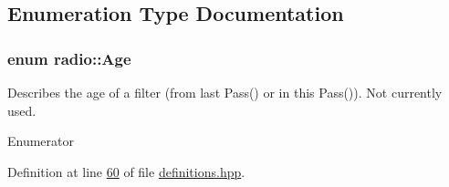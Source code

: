 \subsection{Enumeration Type Documentation}
\hypertarget{namespaceradio_a90839d95c13fa21f45e9cd380e38f1f3}{
\subsubsection[{Age}]{\setlength{\rightskip}{0pt plus 5cm}enum {\bf radio\+::\+Age}}}\label{namespaceradio_a90839d95c13fa21f45e9cd380e38f1f3}
Describes the age of a filter (from last Pass() or in this Pass()). Not currently used. \begin{Desc}
\item[Enumerator]\par
\begin{description}
\item[{\em 
\hypertarget{namespaceradio_a90839d95c13fa21f45e9cd380e38f1f3afbe8ecd067dc1095175b7cdc7cecbb82}{O\+L\+D}\label{namespaceradio_a90839d95c13fa21f45e9cd380e38f1f3afbe8ecd067dc1095175b7cdc7cecbb82}
}]\item[{\em 
\hypertarget{namespaceradio_a90839d95c13fa21f45e9cd380e38f1f3ac1a7d3b0b6d1c9639e94bdd8c8692686}{N\+E\+W}\label{namespaceradio_a90839d95c13fa21f45e9cd380e38f1f3ac1a7d3b0b6d1c9639e94bdd8c8692686}
}]\end{description}
\end{Desc}


Definition at line \hyperlink{definitions_8hpp_source_l00060}{60} of file \hyperlink{definitions_8hpp_source}{definitions.\+hpp}.

